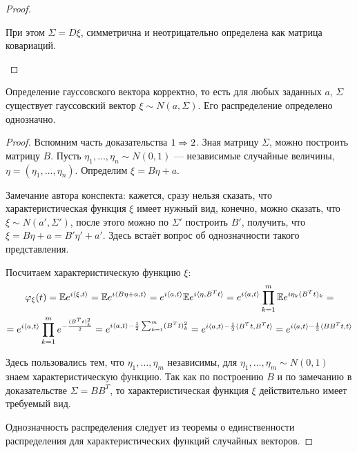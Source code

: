 \begin{proof}
\begin{itemize}
        При этом $\Sigma = D\xi$, симметрична и неотрицательно определена как матрица ковариаций.
    \end{itemize}
\end{proof}

\begin{corollary}
    Определение гауссовского вектора корректно, то есть для любых заданных $a$, $\Sigma$ существует гауссовский вектор $\xi \sim N(a, \Sigma).$ Его распределение определено однозначно.
\end{corollary}

\begin{proof}
    Вспомним часть доказательства $1 \Rightarrow 2$. Зная матрицу $\Sigma$, можно построить матрицу $B$. Пусть $\eta_1, \ldots, \eta_n \sim N(0, 1)$ --- независимые случайные величины, $\eta = (\eta_1, \ldots, \eta_n)$. Определим $\xi = B \eta + a$.

    Замечание автора конспекта: кажется, сразу нельзя сказать, что характеристическая функция $\xi$ имеет нужный вид, конечно, можно сказать, что $\xi \sim N(a', \Sigma')$, после этого можно по $\Sigma'$ построить $B'$, получить, что $\xi = B \eta + a = B' \eta' + a'$. Здесь встаёт вопрос об однозначности такого представления.

    Посчитаем характеристическую функцию $\xi$:
    \large
    \begin{multline*}
        \varphi_\xi(t) = \mathbb{E} e^{i \langle \xi, t \rangle} = \mathbb{E} e^{i \langle B \eta + a, t \rangle} = e^{i \langle a, t \rangle} \mathbb{E} e^{i \langle \eta, B^T t \rangle} = e^{i \langle a, t \rangle} \prod_{k=1}^m \mathbb{E} e^{i \eta_k (B^T t)_k} =
        \\
        = e^{i \langle a, t \rangle} \prod_{k=1}^m e^{-\frac{(B^T t)_k^2}{2}} = e^{i \langle a, t \rangle - \frac{1}{2} \sum_{k=1}^m (B^T t)_k^2} = e^{i \langle a, t \rangle - \frac{1}{2} \langle B^T t, B^T t \rangle} = e^{i \langle a, t \rangle - \frac{1}{2} \langle B B^T t, t \rangle}
    \end{multline*}
    \normalsize

    Здесь пользовались тем, что $\eta_1, \ldots, \eta_m$ независимы, для $\eta_1, \ldots, \eta_m \sim N(0, 1)$ знаем характеристическую функцию. Так как по построению $B$ и по замечанию в доказательстве $\Sigma = B B^T$, то характеристическая функция $\xi$ действительно имеет требуемый вид.

    Однозначность распределения следует из теоремы о единственности распределения для характеристических функций случайных векторов.
\end{proof}

